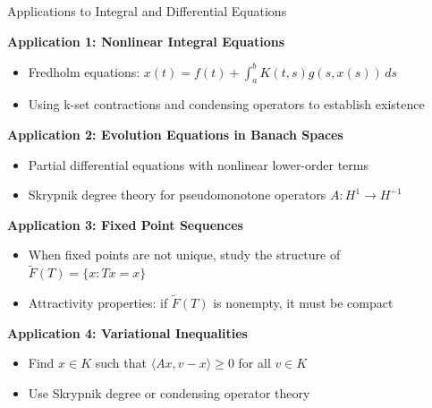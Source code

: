 \documentclass[aspectratio=169,10pt]{beamer}
\begin{document}
\begin{frame}{Applications to Integral and Differential Equations}

\textbf{Application 1: Nonlinear Integral Equations}
\begin{itemize}
    \item Fredholm equations: $x(t) = f(t) + \int_a^b K(t,s) g(s, x(s)) \, ds$
    \item Using k-set contractions and condensing operators to establish existence
\end{itemize}

\vspace{0.3cm}

\textbf{Application 2: Evolution Equations in Banach Spaces}
\begin{itemize}
    \item Partial differential equations with nonlinear lower-order terms
    \item Skrypnik degree theory for pseudomonotone operators $A: H^1 \to H^{-1}$
\end{itemize}

\vspace{0.3cm}

\textbf{Application 3: Fixed Point Sequences}
\begin{itemize}
    \item When fixed points are not unique, study the structure of $\tilde{F}(T) = \{x : Tx = x\}$
    \item Attractivity properties: if $\tilde{F}(T)$ is nonempty, it must be compact
\end{itemize}

\vspace{0.3cm}

\textbf{Application 4: Variational Inequalities}
\begin{itemize}
    \item Find $x \in K$ such that $\langle Ax, v - x \rangle \geq 0$ for all $v \in K$
    \item Use Skrypnik degree or condensing operator theory
\end{itemize}

\end{frame}
\end{document}
